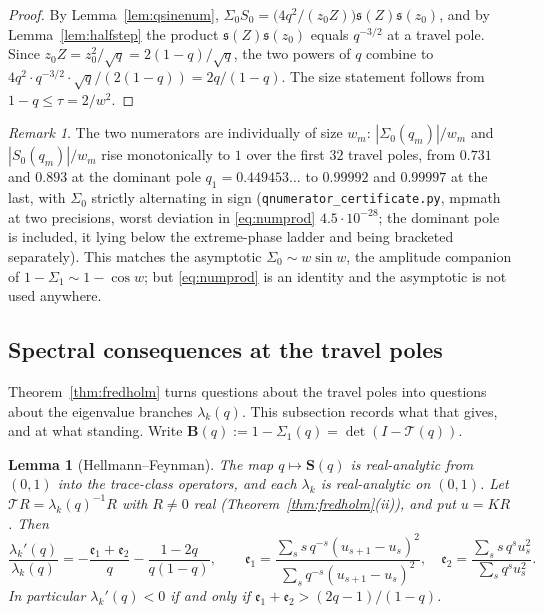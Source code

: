\documentclass[11pt]{article}
\theoremstyle{plain}
\newtheorem{lemma}[theorem]{Lemma}
\theoremstyle{definition}
\theoremstyle{remark}
\newtheorem{remark}[theorem]{Remark}
\begin{document}
\begin{proof}
By Lemma~\ref{lem:qsinenum}, $\Sigma_0S_0=\bigl(4q^2/(z_0Z)\bigr)\mathfrak s(Z)\mathfrak s(z_0)$,
and by Lemma~\ref{lem:halfstep} the product $\mathfrak s(Z)\mathfrak s(z_0)$ equals $q^{-3/2}$ at a
travel pole. Since $z_0Z=z_0^2/\sqrt q=2(1-q)/\sqrt q$, the two powers of $q$ combine to
$4q^2\cdot q^{-3/2}\cdot\sqrt q/(2(1-q))=2q/(1-q)$. The size statement follows from
$1-q\le\tau=2/w^2$.
\end{proof}

\begin{remark}\label{rem:numsize}
The two numerators are individually of size $w_m$: $|\Sigma_0(q_m)|/w_m$ and $|S_0(q_m)|/w_m$ rise
monotonically to $1$ over the first $32$ travel poles, from $0.731$ and $0.893$ at the dominant
pole $q_1=0.449453\ldots$ to $0.99992$ and $0.99997$ at the last, with $\Sigma_0$ strictly
alternating in sign
(\texttt{qnumerator\_certificate.py}, mpmath at two precisions, worst deviation in
\eqref{eq:numprod} $4.5\cdot10^{-28}$; the dominant pole is included, it lying below the
extreme-phase ladder and being bracketed separately). This matches the asymptotic
$\Sigma_0\sim w\sin w$, the
amplitude companion of $1-\Sigma_1\sim1-\cos w$; but \eqref{eq:numprod} is an identity and the
asymptotic is not used anywhere.
\end{remark}

\subsection{Spectral consequences at the travel poles}\label{sec:spectral}

Theorem~\ref{thm:fredholm} turns questions about the travel poles into questions about the
eigenvalue branches $\lambda_k(q)$. This subsection records what that gives, and at what standing.
Write $\mathbf B(q):=1-\Sigma_1(q)=\det(I-\mathcal T(q))$.

\begin{lemma}[Hellmann--Feynman]\label{lem:HF}
The map $q\mapsto\mathbf S(q)$ is real-analytic from $(0,1)$ into the trace-class operators, and
each $\lambda_k$ is real-analytic on $(0,1)$. Let $\mathcal TR=\lambda_k(q)^{-1}R$ with $R\ne0$ real
(Theorem~\ref{thm:fredholm}\textup{(ii)}), and put $u=KR$. Then
\[
   \frac{\lambda_k'(q)}{\lambda_k(q)}=-\frac{\mathfrak e_1+\mathfrak e_2}{q}-\frac{1-2q}{q(1-q)},
   \qquad
   \mathfrak e_1=\frac{\sum_ss\,q^{-s}(u_{s+1}-u_s)^2}{\sum_sq^{-s}(u_{s+1}-u_s)^2},\quad
   \mathfrak e_2=\frac{\sum_ss\,q^su_s^2}{\sum_sq^su_s^2} .
\]
In particular $\lambda_k'(q)<0$ if and only if $\mathfrak e_1+\mathfrak e_2>(2q-1)/(1-q)$.
\end{lemma}
\end{document}
